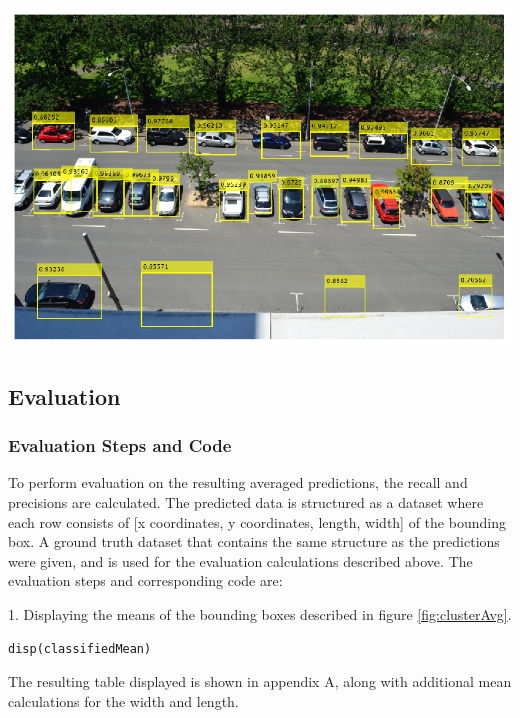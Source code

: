 \documentclass[man]{apa7}
\begin{document}
\begin{minipage}{\linewidth}
  \includegraphics[height=\textheight/2,width=\textwidth/1]{figures/clusterAvg.png}
  \label{fig:clusterAvg}
\end{minipage}

\subsection{Evaluation}

\subsubsection{Evaluation Steps and Code}

To perform evaluation on the resulting averaged predictions, the recall and precisions are calculated. The predicted data is structured as a dataset where each row consists of [x coordinates, y coordinates, length, width] of the bounding box. A ground truth dataset that contains the same structure as the predictions were given, and is used for the evaluation calculations described above. The evaluation steps and corresponding code are:

1. Displaying the means of the bounding boxes described in figure \ref{fig:clusterAvg}.

\begin{lstlisting}[]
% x(1), y(2), length(3), width(4)
disp(classifiedMean)
\end{lstlisting}

The resulting table displayed is shown in appendix A, along with additional mean calculations for the width and length. \newline
\end{document}
